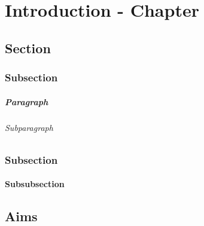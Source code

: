 \chapter{Introduction - Chapter}
\section{Section}

\subsection{Subsection}
\paragraph{Paragraph}
\subparagraph{Subparagraph}

\subsection{Subsection}

\subsubsection{Subsubsection}

\section{Aims}